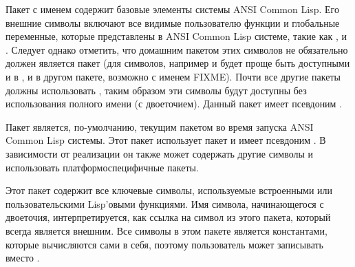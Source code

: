 \begin{flushdesc}
\item[\cdf{common-lisp}]
Пакет с именем  содержит базовые элементы системы ANSI Common
Lisp. Его внешние символы включают все видимые пользователю функции и глобальные
переменные, которые представлены в ANSI Common Lisp системе, такие как
,  и .
Следует однако отметить, что домашним пакетом этих символов не обязательно
должен является пакет  (для символов, например  и
 будет проще быть доступными и в , и в другом
пакете, возможно с именем  FIXME).
Почти все другие пакеты должны использовать , таким образом эти
символы будут доступны без использования полного имени (с двоеточием).
Данный пакет имеет псевдоним .

\item[\cdf{common-lisp-user}]
Пакет  является, по-умолчанию, текущим пакетом во время
запуска ANSI Common Lisp системы.
Этот пакет использует пакет  и имеет псевдоним .
В зависимости от реализации он также может содержать другие символы и
использовать платформоспецифичные пакеты.
\end{flushdesc}

\begin{flushdesc}
\item[\cdf{keyword}]
Этот пакет содержит все ключевые символы, используемые встроенными или
пользовательскими Lisp'овыми функциями. Имя символа, начинающегося с двоеточия,
интерпретируется, как ссылка на символ из этого пакета, который всегда является
внешним. Все символы в этом пакете является константами, которые вычисляются
сами в себя, поэтому пользователь может записывать  вместо .
\end{flushdesc}

